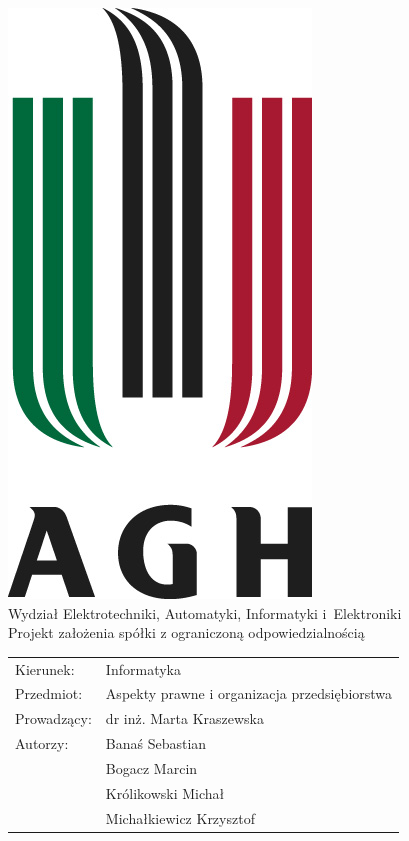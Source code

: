 \documentclass[a4paper,12pt,oneside]{article}
\begin{document}
	\begin{titlepage}
		\begin{center}
			\includegraphics[keepaspectratio]{agh.jpg}\\[0.5cm]
			{\large Wydział Elektrotechniki, Automatyki, Informatyki i~Elektroniki}\\[0.5cm]
			{\huge Projekt założenia spółki z ograniczoną odpowiedzialnością}\\[1cm]
			\begin{table}[!h]
				\begin{tabular}{ll}
					Kierunek: & Informatyka \\
					Przedmiot: & Aspekty prawne i organizacja przedsiębiorstwa\\
					Prowadzący: & dr inż. Marta Kraszewska\\
					Autorzy: &Banaś Sebastian\\
					&Bogacz Marcin\\
					&Królikowski Michał\\
					&Michałkiewicz Krzysztof\\
				\end{tabular}
			\end{table}
		\end{center}
	\end{titlepage}

	\tableofcontents
	
	
	
	
	
	
\end{document}
